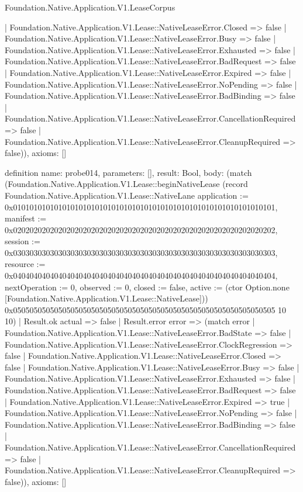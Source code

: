 \begin{lexlean}{Foundation.Native.Application.V1.LeaseCorpus}
\begin{semanticmodule}
{      | Foundation.Native.Application.V1.Lease::NativeLeaseError.Closed => false
      | Foundation.Native.Application.V1.Lease::NativeLeaseError.Busy => false
      | Foundation.Native.Application.V1.Lease::NativeLeaseError.Exhausted => false
      | Foundation.Native.Application.V1.Lease::NativeLeaseError.BadRequest => false
      | Foundation.Native.Application.V1.Lease::NativeLeaseError.Expired => false
      | Foundation.Native.Application.V1.Lease::NativeLeaseError.NoPending => false
      | Foundation.Native.Application.V1.Lease::NativeLeaseError.BadBinding => false
      | Foundation.Native.Application.V1.Lease::NativeLeaseError.CancellationRequired => false
      | Foundation.Native.Application.V1.Lease::NativeLeaseError.CleanupRequired => false)),
  axioms: []
}

definition{
  name: probe014,
  parameters: [],
  result: Bool,
  body: (match (Foundation.Native.Application.V1.Lease::beginNativeLease (record Foundation.Native.Application.V1.Lease::NativeLane {application := 0x0101010101010101010101010101010101010101010101010101010101010101, manifest := 0x0202020202020202020202020202020202020202020202020202020202020202, session := 0x0303030303030303030303030303030303030303030303030303030303030303, resource := 0x0404040404040404040404040404040404040404040404040404040404040404, nextOperation := 0, observed := 0, closed := false, active := (ctor Option.none [Foundation.Native.Application.V1.Lease::NativeLease])}) 0x0505050505050505050505050505050505050505050505050505050505050505 10 10)
    | Result.ok actual => false
    | Result.error error => (match error
      | Foundation.Native.Application.V1.Lease::NativeLeaseError.BadState => false
      | Foundation.Native.Application.V1.Lease::NativeLeaseError.ClockRegression => false
      | Foundation.Native.Application.V1.Lease::NativeLeaseError.Closed => false
      | Foundation.Native.Application.V1.Lease::NativeLeaseError.Busy => false
      | Foundation.Native.Application.V1.Lease::NativeLeaseError.Exhausted => false
      | Foundation.Native.Application.V1.Lease::NativeLeaseError.BadRequest => false
      | Foundation.Native.Application.V1.Lease::NativeLeaseError.Expired => true
      | Foundation.Native.Application.V1.Lease::NativeLeaseError.NoPending => false
      | Foundation.Native.Application.V1.Lease::NativeLeaseError.BadBinding => false
      | Foundation.Native.Application.V1.Lease::NativeLeaseError.CancellationRequired => false
      | Foundation.Native.Application.V1.Lease::NativeLeaseError.CleanupRequired => false)),
  axioms: []
}


\end{semanticmodule}
\end{lexlean}
